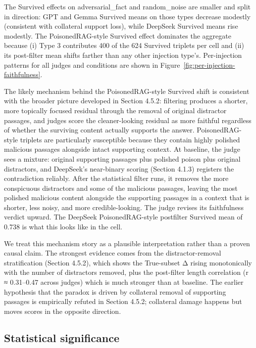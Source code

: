 The Survived effects on adversarial\_fact and random\_noise are smaller and split in direction: GPT and Gemma Survived means on those types decrease modestly (consistent with collateral support loss), while DeepSeek Survived means rise modestly. The PoisonedRAG-style Survived effect dominates the aggregate because (i) Type 3 contributes 400 of the 624 Survived triplets per cell and (ii) its post-filter mean shifts farther than any other injection type's. Per-injection patterns for all judges and conditions are shown in Figure~\ref{fig:per-injection-faithfulness}.

The likely mechanism behind the PoisonedRAG-style Survived shift is consistent with the broader picture developed in Section 4.5.2: filtering produces a shorter, more topically focused residual through the removal of original distractor passages, and judges score the cleaner-looking residual as more faithful regardless of whether the surviving content actually supports the answer. PoisonedRAG-style triplets are particularly susceptible because they contain highly polished malicious passages alongside intact supporting context. At baseline, the judge sees a mixture: original supporting passages plus polished poison plus original distractors, and DeepSeek's near-binary scoring (Section 4.1.3) registers the contradiction reliably. After the statistical filter runs, it removes the more conspicuous distractors and some of the malicious passages, leaving the most polished malicious content alongside the supporting passages in a context that is shorter, less noisy, and more credible-looking. The judge revises its faithfulness verdict upward. The DeepSeek PoisonedRAG-style postfilter Survived mean of 0.738 is what this looks like in the cell.

We treat this mechanism story as a plausible interpretation rather than a proven causal claim. The strongest evidence comes from the distractor-removal stratification (Section 4.5.2), which shows the True-subset Δ rising monotonically with the number of distractors removed, plus the post-filter length correlation (r ≈ 0.31–0.47 across judges) which is much stronger than at baseline. The earlier hypothesis that the paradox is driven by collateral removal of supporting passages is empirically refuted in Section 4.5.2; collateral damage happens but moves scores in the opposite direction.

\subsection{Statistical significance}

